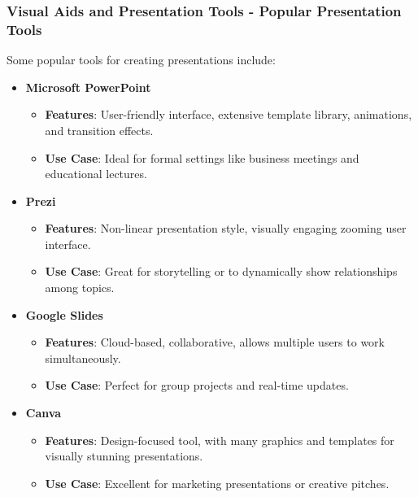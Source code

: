 \documentclass[aspectratio=169]{beamer}
\begin{document}
\begin{frame}[fragile]
    \frametitle{Visual Aids and Presentation Tools - Popular Presentation Tools}
    Some popular tools for creating presentations include:
    \begin{itemize}
        \item \textbf{Microsoft PowerPoint}
            \begin{itemize}
                \item \textbf{Features}: User-friendly interface, extensive template library, animations, and transition effects.
                \item \textbf{Use Case}: Ideal for formal settings like business meetings and educational lectures.
            \end{itemize}
            
        \item \textbf{Prezi}
            \begin{itemize}
                \item \textbf{Features}: Non-linear presentation style, visually engaging zooming user interface.
                \item \textbf{Use Case}: Great for storytelling or to dynamically show relationships among topics.
            \end{itemize}
        
        \item \textbf{Google Slides}
            \begin{itemize}
                \item \textbf{Features}: Cloud-based, collaborative, allows multiple users to work simultaneously.
                \item \textbf{Use Case}: Perfect for group projects and real-time updates.
            \end{itemize}
        
        \item \textbf{Canva}
            \begin{itemize}
                \item \textbf{Features}: Design-focused tool, with many graphics and templates for visually stunning presentations.
                \item \textbf{Use Case}: Excellent for marketing presentations or creative pitches.
            \end{itemize}
    \end{itemize}
\end{frame}
\end{document}

